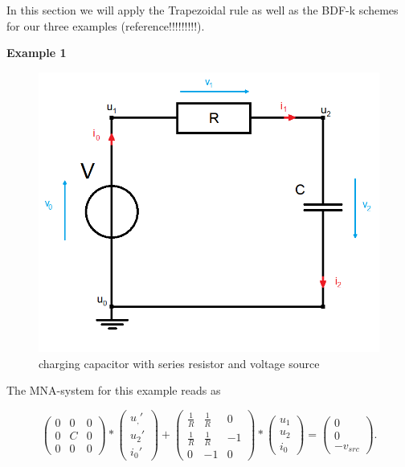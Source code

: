 	In this section we will apply the Trapezoidal rule as well as the BDF-k schemes for our three examples (reference!!!!!!!!!).
	
	
	\textbf{Example 1} \\
		
	\begin{figure}[H]
		\centering
		\includegraphics[scale=0.4]{pictures/Example1_simple_p2.png}
		\caption{charging capacitor with series resistor and voltage source}
	\end{figure}
	
	The MNA-system for this example reads as
	
	\begin{equation}
		\label{eq:MNA-system of chargin capacitor}
		\begin{pmatrix}
			0 & 0 & 0 \\
			0 & C & 0 \\
			0 & 0 & 0
		\end{pmatrix}
		*
		\begin{pmatrix}
			u_,' \\
			u_2' \\
			i_0'
		\end{pmatrix}
		+
		\begin{pmatrix}
			\frac{1}{R} & \frac{1}{R} & 0 \\
			\frac{1}{R} & \frac{1}{R} & -1 \\
			0 & -1 & 0 
		\end{pmatrix}
		*
		\begin{pmatrix}
			u_1 \\
			u_2 \\
			i_0
		\end{pmatrix}
		=
		\begin{pmatrix}
			0 \\
			0 \\
			-v_{src}
		\end{pmatrix}.
	\end{equation}

